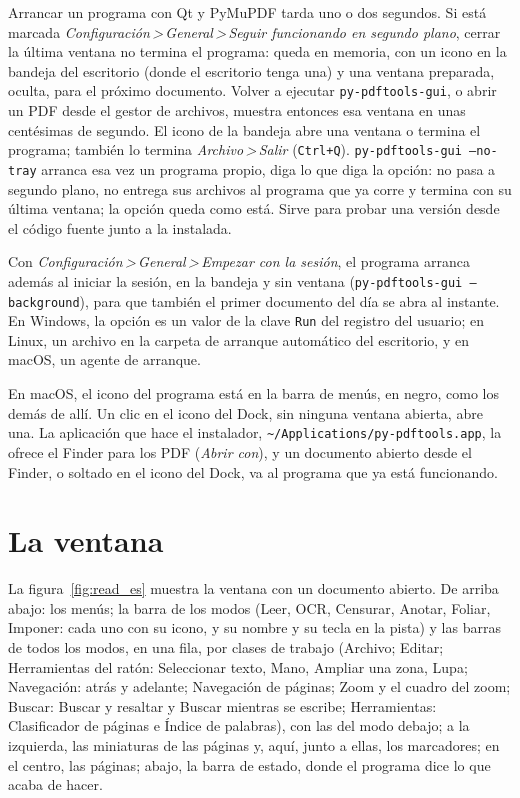 \documentclass[12pt,
              article,
              oneside
              ]{memoir}
\newcommand*{\menu}[1]{\textit{#1}}
\newcommand*{\then}{\,>\,}
\newcommand*{\key}[1]{\texttt{#1}}
\begin{document}
%
Arrancar un programa con Qt y PyMuPDF tarda uno o dos segundos. Si está
marcada \menu{Configuración\then General\then Seguir funcionando en
segundo plano}, cerrar la última ventana no termina el programa: queda en
memoria, con un icono en la bandeja del escritorio (donde el escritorio
tenga una) y una ventana preparada, oculta, para el próximo documento.
Volver a ejecutar \texttt{py-pdftools-gui}, o abrir un PDF desde el gestor
de archivos, muestra entonces esa ventana en unas centésimas de segundo. El
icono de la bandeja abre una ventana o termina el programa; también lo
termina \menu{Archivo\then Salir} (\key{Ctrl+Q}). \texttt{py-pdftools-gui
--no-tray} arranca esa vez un programa propio, diga lo que diga la opción: no
pasa a segundo plano, no entrega sus archivos al programa que ya corre y
termina con su última ventana; la opción queda como está. Sirve para probar
una versión desde el código fuente junto a la instalada.

%
Con \menu{Configuración\then General\then Empezar con la sesión}, el
programa arranca además al iniciar la sesión, en la bandeja y sin ventana
(\texttt{py-pdftools-gui --background}), para que también el primer
documento del día se abra al instante. En Windows, la opción es un valor de
la clave \texttt{Run} del registro del usuario; en Linux, un archivo en la
carpeta de arranque automático del escritorio, y en macOS, un agente de
arranque.

%
En macOS, el icono del programa está en la barra de menús, en negro, como
los demás de allí. Un clic en el icono del Dock, sin ninguna ventana
abierta, abre una. La aplicación que hace el instalador,
\texttt{\textasciitilde/Applications/py-pdftools.app}, la ofrece el Finder
para los PDF (\menu{Abrir con}), y un documento abierto desde el Finder, o
soltado en el icono del Dock, va al programa que ya está funcionando.

\section{La ventana}
\label{sec:window}

%
La figura~\ref{fig:read_es} muestra la ventana con un documento abierto. De
arriba abajo: los menús; la barra de los modos (Leer, OCR, Censurar,
Anotar, Foliar, Imponer: cada uno con su icono, y su nombre y su tecla en la
pista) y las barras de todos los modos, en una fila, por clases de trabajo
(Archivo; Editar; Herramientas del ratón: Seleccionar texto, Mano, Ampliar
una zona, Lupa; Navegación: atrás y adelante; Navegación de páginas; Zoom y
el cuadro del zoom; Buscar: Buscar y resaltar y Buscar mientras se escribe;
Herramientas: Clasificador de páginas e Índice de palabras), con las del
modo debajo; a la
izquierda, las miniaturas de las páginas y, aquí, junto a ellas, los
marcadores; en el centro, las páginas; abajo, la barra de estado, donde el
programa dice lo que acaba de hacer.
\end{document}
